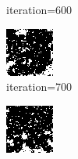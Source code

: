 \documentclass{article}
\begin{document}
\begin{figure}[h]
\begin{subfigure}[t]{0.18\textwidth}
\vspace{-0.6cm}
\caption{iteration=600}
\end{subfigure}\hspace{0.01\textwidth}
\begin{subfigure}[t]{0.18\textwidth}
\centering
\includegraphics[width=\textwidth]{./computational/results/gibbs_comb_sampler_negative_iter_700.png}
\vspace{-0.6cm}
\caption{iteration=700}
\end{subfigure}\hspace{0.01\textwidth}
\begin{subfigure}[t]{0.18\textwidth}
\centering
\includegraphics[width=\textwidth]{./computational/results/gibbs_comb_sampler_negative_iter_800.png}

\end{subfigure}
\end{figure}
\end{document}
